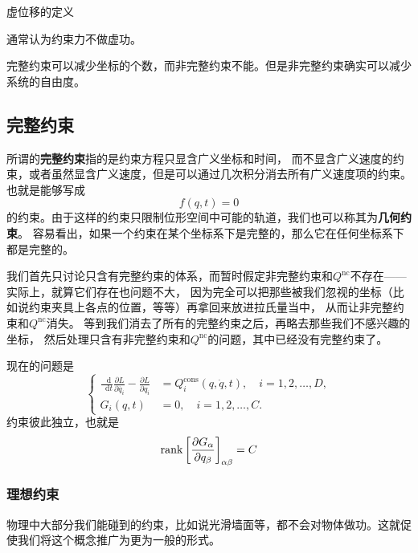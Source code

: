 \documentclass[UTF8, a4paper]{ctexart}
\newcommand*{\diff}{\mathop{}\!\mathrm{d}}
\begin{document}
虚位移的定义

通常认为约束力不做虚功。

完整约束可以减少坐标的个数，而非完整约束不能。但是非完整约束确实可以减少系统的自由度。

\subsection{完整约束}

所谓的\textbf{完整约束}指的是约束方程只显含广义坐标和时间，
而不显含广义速度的约束，或者虽然显含广义速度，但是可以通过几次积分消去所有广义速度项的约束。
也就是能够写成
\begin{equation}
    f(q, t) = 0
\end{equation}
的约束。由于这样的约束只限制位形空间中可能的轨道，我们也可以称其为\textbf{几何约束}。
容易看出，如果一个约束在某个坐标系下是完整的，那么它在任何坐标系下都是完整的。

我们首先只讨论只含有完整约束的体系，而暂时假定非完整约束和$Q^\text{nc}$不存在——实际上，就算它们存在也问题不大，
因为完全可以把那些被我们忽视的坐标（比如说约束夹具上各点的位置，等等）再拿回来放进拉氏量当中，
从而让非完整约束和$Q^\text{nc}$消失。
等到我们消去了所有的完整约束之后，再略去那些我们不感兴趣的坐标，
然后处理只含有非完整约束和$Q^\text{nc}$的问题，其中已经没有完整约束了。

现在的问题是
\begin{equation}
    \left\{
        \begin{aligned}
            \frac{\diff}{\diff t} \frac{\partial L}{\partial \dot{q_i}} - \frac{\partial L}{\partial q_i} &= Q_i^{\text{cons}}(q, \dot{q}, t), 
            \quad i = 1, 2, \ldots, D, \\
            G_i(q, t) &= 0, \quad i = 1, 2, \ldots, C.
        \end{aligned}
    \right.
    \label{eq:holonomic-problem}
\end{equation}
约束彼此独立，也就是
\begin{equation}
    \rank \left[\frac{\partial G_\alpha}{\partial q_\beta}\right]_{\alpha\beta} = C
    \label{eq:independent-constraints-holonomic}
\end{equation}

\subsubsection{理想约束}

物理中大部分我们能碰到的约束，比如说光滑墙面等，都不会对物体做功。这就促使我们将这个概念推广为更为一般的形式。
\end{document}
